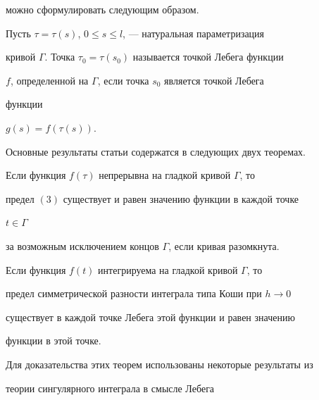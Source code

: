 можно сформулировать следующим образом. 


 


 


\begin{defn} 


Пусть $\tau=\tau(s)$, $0\le s\le l$, --- натуральная параметризация 


кривой $\Gamma$. Точка $\tau_0=\tau(s_0)$ называется точкой Лебега функции 


$f$, определенной на $\Gamma$, если точка $s_0$ является точкой Лебега 


функции 


$g(s)=f(\tau(s))$. 


\end{defn} 


 


Основные результаты статьи содержатся в следующих двух теоремах. 


 


\begin{thm} 


Если функция $f(\tau)$ непрерывна на гладкой кривой $\Gamma$, то 


предел $(3)$ существует и равен значению функции в каждой точке 


$t\in\Gamma$ 


за возможным исключением концов $\Gamma$, если кривая разомкнута. 


\end{thm} 


 


\begin{thm} 


Если функция $f(t)$ интегрируема на гладкой кривой $\Gamma$, то 


предел симметрической разности интеграла типа Коши при $h\to0$ 


существует в каждой точке Лебега этой функции и равен значению 


функции в этой точке. 


\end{thm} 


 


 


Для доказательства этих теорем использованы некоторые результаты из 


теории сингулярного интеграла в смысле Лебега 


